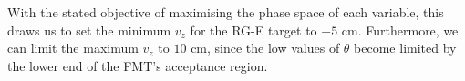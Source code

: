     With the stated objective of maximising the phase space of each variable, this draws us to set the minimum $v_z$ for the RG-E target to $-5$ cm.
    Furthermore, we can limit the maximum $v_z$ to $10$ cm, since the low values of $\theta$ become limited by the lower end of the FMT's acceptance region.

